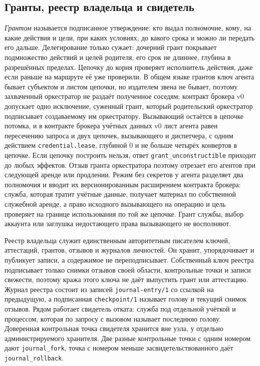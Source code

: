 \documentclass[10pt,a4paper]{article}
\begin{document}
\subsection{Гранты, реестр владельца и свидетель}
\label{sec:grants}

\emph{Грантом} называется подписанное утверждение: кто выдал полномочие, кому, на какие действия и цели, при каких условиях, до какого срока и можно ли передать его дальше. Делегирование только сужает: дочерний грант покрывает подмножество действий и целей родителя, его срок не длиннее, глубина в разрешённых пределах. Цепочку до корня проверяет исполнитель действия, даже если раньше на маршруте её уже проверили. В общем языке грантов ключ агента бывает субъектом и листом цепочки, но издателем звена не бывает, поэтому захваченный оркестратор не раздаёт полученное соседям; контракт брокера v0 допускает одно исключение, суженный грант, который родительский оркестратор подписывает создаваемому им оркестратору. Вызывающий остаётся в цепочке потомка, и в контракте брокера учётных данных v0 лист агента равен пересечению запроса и двух цепочек, вызывающего и диспетчера, с одним действием \texttt{credential.lease}, глубиной 0 и не больше четырёх конвертов в цепочке. Если цепочку построить нельзя, ответ \texttt{grant\_unconstructible} приходит до любых эффектов. Отзыв гранта оркестратора поэтому отрезает его агентов при следующей аренде или продлении. Режим без секретов у агента разделяет два полномочия и вводит их версионированным расширением контракта брокера: служба, которая тратит учётные данные, получает материал по собственной служебной аренде, а право исходного вызывающего на операцию и цель проверяет на границе использования по той же цепочке. Грант службы, выбор аккаунта или заглушка недостающего права вызывающего не восполняют.

Реестр владельца служит единственным авторитетным писателем ключей, аттестаций, грантов, отзывов и журналов личностей. Он хранит, упорядочивает и публикует записи, а содержимое не переподписывает. Собственный ключ реестра подписывает только снимки отзывов своей области, контрольные точки и записи свежести, поэтому кража этого ключа не даёт выпустить грант или аттестацию. Журнал реестра состоит из записей \texttt{journal-entry/1} со ссылкой на предыдущую, а подписанная \texttt{checkpoint/1} называет голову и текущий снимок отзывов. Рядом работает свидетель отката: служба под отдельной учёткой и процессом, которая по запросу с вызовом называет последнюю голову. Доверенная контрольная точка свидетеля хранится вне узла, у отдельно администрируемого хранителя. Две разные контрольные точки с одним номером дают \texttt{journal\_fork}, точка с номером меньше засвидетельствованного даёт \texttt{journal\_rollback}.
\end{document}
